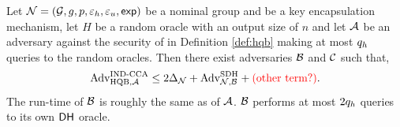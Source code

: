 \begin{theorem}
    \label{theorem:sdh_kem-coll_imply_hqb}
    Let $\mathcal{N} = (\mathcal{G}, g, p, \varepsilon_h , \varepsilon_u , \textsf{exp})$ be a nominal group and \kem be a key encapsulation mechanism, let $H$ be a random oracle with an output size of $n$ and let $\mathcal{A}$ be an adversary against the \cca security of \hqb in Definition \ref{def:hqb} making at most $q_h$ queries to the random oracles.
    Then there exist adversaries $\mathcal{B}$ and $\mathcal{C}$ such that,
    \[ \text{Adv}_{\text{HQB}, \mathcal{A}}^{\text{IND-CCA}} \leq 2 \Delta_{\mathcal{N}} +  \text{Adv}_{\mathcal{N}, \mathcal{B}}^{\text{SDH}} + \text{\textcolor{red}{(other term?)}}. \]
    The run-time of $\mathcal{B}$ is roughly the same as of $\mathcal{A}$.
    $\mathcal{B}$ performs at most $2 q_h$ queries to its own $\textsf{DH}$ oracle.
\end{theorem}


